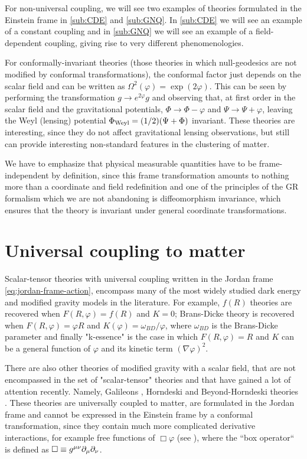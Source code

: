 For non-universal coupling, we will see two examples of theories formulated in the Einstein frame in \cref{sub:CDE} and \cref{sub:GNQ}.
In \cref{sub:CDE} we will see an example of a constant coupling and in \cref{sub:GNQ} we will see an example of a field-dependent coupling, 
giving rise to very different phenomenologies.

For conformally-invariant theories (those theories in which null-geodesics are not modified by conformal transformations), the conformal factor
just depends on the scalar field and can be written as $\Omega^2(\varphi)=\exp(2\varphi)$. 
This can be seen by performing the transformation $g \rightarrow e^{2\varphi} g$ and 
observing that, at first order in the
scalar field and the gravitational potentials, $\Phi \rightarrow \Phi-\varphi$ and $\Psi \rightarrow \Psi+\varphi$, leaving 
the Weyl (lensing) potential $\Phi_{\rm Weyl} = (1/2)(\Psi + \Phi)$ invariant.
These theories are interesting, since they do not affect gravitational lensing observations,
but still can provide interesting non-standard features in the clustering of matter.


We have to emphasize that physical measurable quantities have to be frame-independent by definition,
since this frame transformation amounts to nothing more than a coordinate and field redefinition 
and one of the principles of the GR formalism which we are not abandoning
is diffeomorphism invariance, which ensures that 
the theory is invariant under general coordinate transformations.


\section{Universal coupling to matter \label{sec:universal-coupling}}

Scalar-tensor theories with universal coupling written in the Jordan frame \cref{eq:jordan-frame-action}, 
encompass many of the most widely studied dark energy and modified gravity models in the literature. 
For example, $f(R)$ theories \cite{de2010f} are recovered when $F(R,\varphi) = f(R)$ and $K=0$;
Brans-Dicke theory \cite{brans1961mach} is recovered when $F(R,\varphi) = \varphi R $ and 
$K(\varphi) = \omega_{BD}/\varphi$, where $\omega_{BD}$ is the Brans-Dicke parameter and finally "k-essence" 
\cite{armendariz2001essentials} is the case in which $F(R,\varphi) = R$ and $K$ can be a general
function of $\varphi$ and its kinetic term $(\nabla \varphi)^2$. 

There are also other theories of modified gravity with a scalar field, that are not encompassed in the set of "scalar-tensor"
theories and that have gained a lot of attention recently. Namely, Galileons \cite{deffayet2011k}, Horndeski \cite{deffayet2013formal} 
and Beyond-Horndeski theories \cite{gleyzes2015exploring}. 
These theories are universally coupled to matter, are formulated
in the Jordan frame and cannot be expressed in the Einstein frame by a conformal transformation, since they contain much more complicated
derivative interactions, for example free functions of $\Box \varphi$ (see \cite{zumalacarregui2014transforming}), where the ``box operator`` is defined as $\Box \equiv g^{{\mu \nu}}\partial_{\mu}\partial_{\nu}$.

